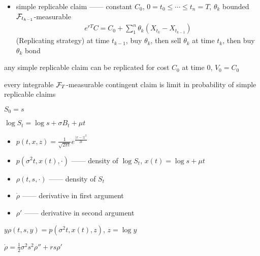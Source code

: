 \begin{itemize}
    \item simple replicable claim ------ constant $C_0$,
     $0 = t_0 \leq \cdots \leq t_n = T$, $\theta_k$ bounded $\mathcal{F}_{t_{k-1}}$-measurable
    \begin{align*}
        e^{rT}C = C_0 + \sum^n_1 \theta_k (X_{t_k} - X_{t_{k-1}})
    \end{align*}
    (Replicating strategy) at time $t_{k-1}$, buy $\theta_k$, then sell $\theta_k$ at time $t_k$, then buy $\theta_k$ bond
\end{itemize}

\begin{fact}
    any simple replicable claim can be replicated for cost $C_0$ at time 0, $V_0 = C_0$
\end{fact}

\begin{fact}
    every integrable $\mathcal{F}_T$-measurable contingent claim is limit in probability of simple replicable claims
\end{fact}

\begin{setting}
    $S_0 = s$
\end{setting}

\begin{fact}
    $\log S_t = \log s + \sigma B_t + \mu t$
\end{fact}

\begin{itemize}
    \item $p(t, x, z) = \frac{1}{\sqrt{2\pi t}}e^{\frac{|x - z|^2}{2t}}$
    \item $p(\sigma^2 t, x(t), \cdot)$ ------ density of $\log S_t$, $x(t) = \log s + \mu t$
    \item $\rho(t, s, \cdot)$ ------ density of $S_t$
    \item $\dot{\rho}$ ------ derivative in first argument
    \item $\rho'$ ------ derivative in second argument
\end{itemize}

\begin{fact}
    $y\rho(t, s, y) = p(\sigma^2 t, x(t), z)$, $z = \log y$
\end{fact}

\begin{fact}
    $\dot\rho = \frac{1}{2}\sigma^2 s^2 \rho'' + rs\rho'$
\end{fact}

